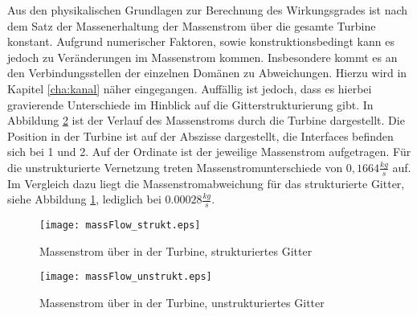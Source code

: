 Aus den physikalischen Grundlagen zur Berechnung des Wirkungsgrades ist nach dem Satz der Massenerhaltung der Massenstrom über die gesamte Turbine konstant.
Aufgrund numerischer Faktoren, sowie konstruktionsbedingt kann es jedoch zu Veränderungen im Massenstrom kommen. 
Insbesondere kommt es an den Verbindungsstellen der einzelnen Domänen zu Abweichungen. Hierzu wird in Kapitel \ref{cha:kanal} näher eingegangen.
Auffällig ist jedoch, dass es hierbei gravierende Unterschiede im Hinblick auf die Gitterstrukturierung gibt. In Abbildung \ref{fig:massFlowUnstrukt} ist der Verlauf des Massenstroms durch die Turbine dargestellt. Die Position in der Turbine ist auf der Abszisse dargestellt, die Interfaces befinden sich bei 1 und 2. Auf der Ordinate ist der jeweilige Massenstrom aufgetragen. Für die unstrukturierte Vernetzung treten Massenstromunterschiede von $0,1664 \frac{kg}{s}$ auf. Im Vergleich dazu liegt die Massenstromabweichung für das strukturierte Gitter, siehe Abbildung \ref{fig:massFlowStrukt}, lediglich bei $0.00028\frac{kg}{s}$.

 \begin{figure}[htbp]
	\centering
	\texttt{[image: massFlow\_strukt.eps]}
	\caption{Massenstrom über in der Turbine, strukturiertes Gitter} \label{fig:massFlowStrukt}
\end{figure} 
 \begin{figure}[htbp]
	\centering
	\texttt{[image: massFlow\_unstrukt.eps]}
	\caption{Massenstrom über in der Turbine, unstrukturiertes Gitter} \label{fig:massFlowUnstrukt}
\end{figure} 